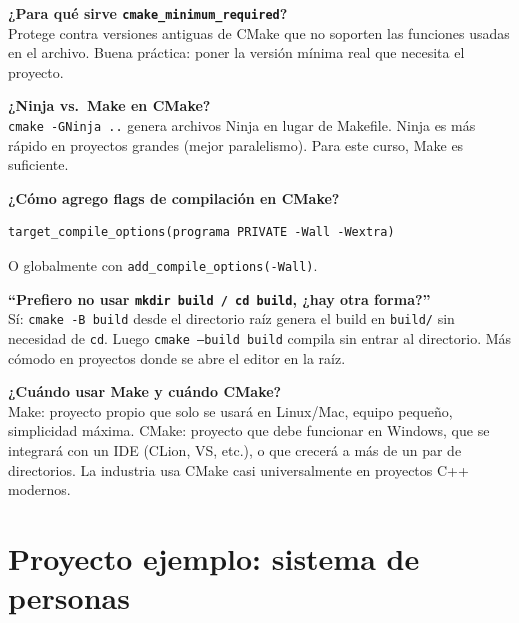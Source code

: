 \documentclass[12pt, oneside]{article}
\begin{document}
\begin{notaprofesor}
  \textbf{¿Para qué sirve \texttt{cmake\_minimum\_required}?}\\
  Protege contra versiones antiguas de CMake que no soporten las funciones
  usadas en el archivo.  Buena práctica: poner la versión mínima real que
  necesita el proyecto.

  \medskip
  \textbf{¿Ninja vs.\ Make en CMake?}\\
  \texttt{cmake -GNinja ..} genera archivos Ninja en lugar de Makefile.
  Ninja es más rápido en proyectos grandes (mejor paralelismo).
  Para este curso, Make es suficiente.

  \medskip
  \textbf{¿Cómo agrego flags de compilación en CMake?}\\
\begin{verbatim}
target_compile_options(programa PRIVATE -Wall -Wextra)
\end{verbatim}
  O globalmente con \texttt{add\_compile\_options(-Wall)}.

  \medskip
  \textbf{``Prefiero no usar \texttt{mkdir build / cd build}, ¿hay otra forma?''}\\
  Sí: \texttt{cmake -B build} desde el directorio raíz genera el build
  en \texttt{build/} sin necesidad de \texttt{cd}.  Luego
  \texttt{cmake --build build} compila sin entrar al directorio.
  Más cómodo en proyectos donde se abre el editor en la raíz.

  \medskip
  \textbf{¿Cuándo usar Make y cuándo CMake?}\\
  Make: proyecto propio que solo se usará en Linux/Mac, equipo pequeño,
  simplicidad máxima.  CMake: proyecto que debe funcionar en Windows,
  que se integrará con un IDE (CLion, VS, etc.), o que crecerá a más de
  un par de directorios.  La industria usa CMake casi universalmente en
  proyectos C++ modernos.
\end{notaprofesor}

\section{Proyecto ejemplo: sistema de personas}
\end{document}
